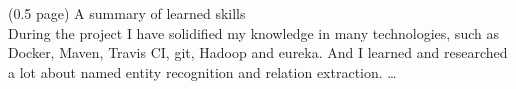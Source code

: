 (0.5 page) 
A summary of learned skills\\
During the project I have solidified my knowledge in many technologies, such as Docker,
Maven, Travis CI, git, Hadoop and eureka. And I learned and researched a lot about
named entity recognition and relation extraction.
\dots